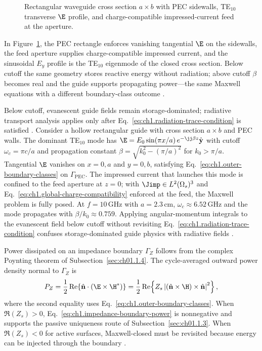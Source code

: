 \begin{figure}[t]
\centering
{}
\caption{Rectangular waveguide cross section $a\times b$ with PEC sidewalls, TE$_{10}$ transverse $\E$ profile, and charge-compatible impressed-current feed at the aperture.}
\label{fig:ch1.wp-te10-waveguide}
\end{figure}
In Figure~\ref{fig:ch1.wp-te10-waveguide}, the PEC rectangle enforces vanishing tangential $\E$ on
the sidewalls, the feed aperture supplies charge-compatible impressed current, and the sinusoidal
$E_y$ profile is the TE$_{10}$ eigenmode of the closed cross section. Below cutoff the same
geometry stores reactive energy without radiation; above cutoff $\beta$ becomes real and the guide
supports propagating power---the same Maxwell equations with a different boundary-class outcome
\cite{stratton1941,harrington2001}.

Below cutoff, evanescent guide fields remain storage-dominated; radiative transport analysis applies only after Eq.~\eqref{eq:ch1.radiation-trace-condition} is satisfied \cite{stratton1941}.
Consider a hollow rectangular guide with cross section \(a\times b\) and PEC walls.
The dominant TE\(_{10}\) mode has
\(\E=E_0\sin(\pi x/a)\,e^{-\jj\beta z}\hat{\mathbf{y}}\) with cutoff
\(\omega_c=\pi c/a\) and propagation constant
\(\beta=\sqrt{k_0^2-(\pi/a)^2}\) for \(k_0>\pi/a\). Tangential \(\E\) vanishes on
\(x=0,a\) and \(y=0,b\), satisfying Eq.~\eqref{eq:ch1.outer-boundary-classes} on
\(\Gamma_{\mathrm{PEC}}\). The impressed current that launches this mode is
confined to the feed aperture at \(z=0\); with \(\Jimp\in L^2(\Omega_s)^3\) and
Eq.~\eqref{eq:ch1.global-charge-compatibility} enforced at the feed, the Maxwell problem is fully posed. At \(f=10\,\mathrm{GHz}\) with \(a=2.3\,\mathrm{cm}\),
\(\omega_c\approx 6.52\,\mathrm{GHz}\) and the mode propagates with
\(\beta/k_0\approx 0.759\). Applying angular-momentum integrals to
the evanescent field below cutoff without revisiting
Eq.~\eqref{eq:ch1.radiation-trace-condition} confuses storage-dominated guide
physics with radiative fields \cite{stratton1941}.

Power dissipated on an impedance boundary \(\Gamma_Z\) follows from the complex
Poynting theorem of Subsection~\ref{sec:ch01.1.4}. The cycle-averaged outward power
density normal to \(\Gamma_Z\) is
\begin{equation}
\label{eq:ch1.impedance-boundary-power}
P_Z=
\frac{1}{2}\Re\!\left\{
\hat{\mathbf{n}}\cdot\left(\E\times\H^*\right)
\right\}
=\frac{1}{2}\Re\!\left\{
Z_s\left|(\hat{\mathbf{n}}\times\H)\times\hat{\mathbf{n}}\right|^2
\right\},
\end{equation}
where the second equality uses Eq.~\eqref{eq:ch1.outer-boundary-classes}. When
\(\Re(Z_s)>0\), Eq.~\eqref{eq:ch1.impedance-boundary-power} is nonnegative and
supports the passive uniqueness route of Subsection~\ref{sec:ch01.1.3}.
When \(\Re(Z_s)<0\) for active surfaces, Maxwell-closed must be revisited because
energy can be injected through the boundary \cite{stratton1941}.



